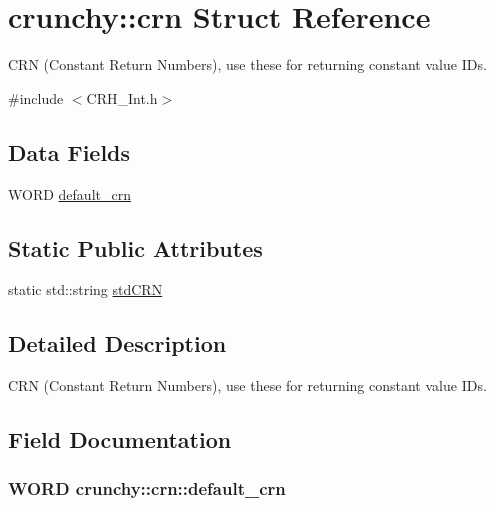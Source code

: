 \hypertarget{structcrunchy_1_1crn}{}\section{crunchy\+:\+:crn Struct Reference}
\label{structcrunchy_1_1crn}


C\+RN (Constant Return Numbers), use these for returning constant value ID\textquotesingle{}s.  




{\ttfamily \#include $<$C\+R\+H\+\_\+\+Int.\+h$>$}

\subsection*{Data Fields}
\begin{DoxyCompactItemize}
\item 
W\+O\+RD \hyperlink{structcrunchy_1_1crn_af6e0614d6a09fa22b503c55937e974aa}{default\+\_\+crn}
\end{DoxyCompactItemize}
\subsection*{Static Public Attributes}
\begin{DoxyCompactItemize}
\item 
static std\+::string \hyperlink{structcrunchy_1_1crn_ae5f71a10acf2431498d683fee28851db}{std\+C\+RN}
\end{DoxyCompactItemize}


\subsection{Detailed Description}
C\+RN (Constant Return Numbers), use these for returning constant value ID\textquotesingle{}s. 

\subsection{Field Documentation}
\subsubsection[{default\+\_\+crn}]{\setlength{\rightskip}{0pt plus 5cm}W\+O\+RD crunchy\+::crn\+::default\+\_\+crn}\hypertarget{structcrunchy_1_1crn_af6e0614d6a09fa22b503c55937e974aa}{}\label{structcrunchy_1_1crn_af6e0614d6a09fa22b503c55937e974aa}

